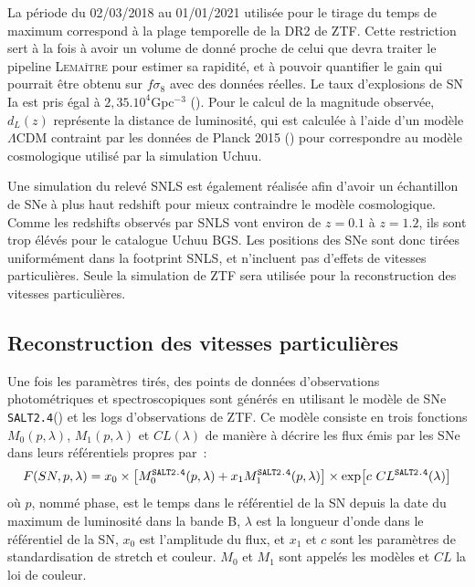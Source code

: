 \documentclass{book}
\def\lemaitre{\textsc{Lemaître}\xspace}
\def\saltd{\texttt{SALT2.4}\xspace}
\begin{document}
La période du 02/03/2018 au 01/01/2021 utilisée pour le tirage du temps de maximum correspond à la plage temporelle de la DR2 de ZTF\cite{rigault_ztf_2024}. Cette restriction sert à la fois à avoir un volume de donné proche de celui que devra traiter le pipeline \lemaitre pour estimer sa rapidité, et à pouvoir quantifier le gain qui pourrait être obtenu sur $f\sigma_8$ avec des données réelles. Le taux d'explosions de SN Ia est pris égal à $2,35 .10^4$Gpc$^{-3}$ (\cite{perley_zwicky_2020}).
Pour le calcul de la magnitude observée, $d_L(z)$ représente la distance de luminosité, qui est calculée à l'aide d'un modèle $\Lambda$CDM contraint par les données de Planck 2015 (\cite{planck_collaboration_planck_2016}) pour correspondre au modèle cosmologique utilisé par la simulation Uchuu.

Une simulation du relevé SNLS est également réalisée afin d'avoir un échantillon de SNe à plus haut redshift pour mieux contraindre le modèle cosmologique. Comme les redshifts observés par SNLS vont environ de $z=0.1$ à $z=1.2$, ils sont trop élévés pour le catalogue Uchuu BGS. Les positions des SNe sont donc tirées uniformément dans la footprint SNLS, et n'incluent pas d'effets de vitesses particulières. Seule la simulation de ZTF sera utilisée pour la reconstruction des vitesses particulières.

\subsection{Reconstruction des vitesses particulières}

Une fois les paramètres tirés, des points de données d'observations photométriques et spectroscopiques sont générés en utilisant le modèle de SNe \saltd (\cite{guy_salt2_2007, rigault_ztf_2024}) et les logs d'observations de ZTF. Ce modèle consiste en trois fonctions $M_0(p, \lambda)$, $M_1(p, \lambda)$ et $CL(\lambda)$ de manière à décrire les flux émis par les SNe dans leurs référentiels propres par~:
\begin{equation}
    F(SN, p, \lambda) = x_0 \times \qty[M^{\saltd}_0(p, \lambda) + x_1 M_1^{\saltd}(p, \lambda)] \times \exp[c\ CL^{\saltd}(\lambda)]
\end{equation}
où $p$, nommé phase, est le temps dans le référentiel de la SN depuis la date du maximum de luminosité dans la bande B, $\lambda$ est la longueur d'onde dans le référentiel de la SN, $x_0$ est l'amplitude du flux, et $x_1$ et $c$ sont les paramètres de standardisation de stretch et couleur. $M_0$ et $M_1$ sont appelés les modèles et $CL$ la loi de couleur.
\end{document}
